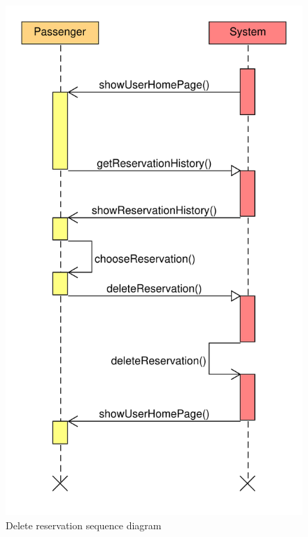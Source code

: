 \begin{figure}
\centering
\includegraphics[width=\textwidth]{tex-images/sequence-delete-reservation}
\caption{Delete reservation sequence diagram}
\end{figure}




